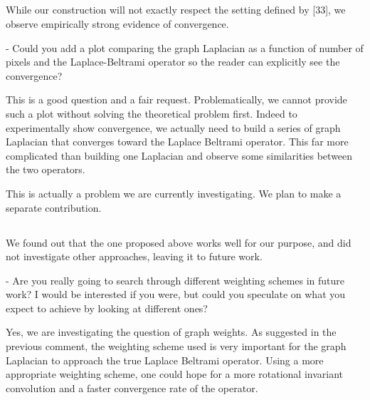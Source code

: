 \documentclass[12pt,a4paper]{article}
\newcommand{\nati}[1]{{\color[rgb]{.1,.6,.1}{NP: #1}}}
\newcommand{\1}{\b{1}}              %
\newcommand{\0}{\b{0}}              %
\begin{document}
\subsection{}
\begin{mdframed}[style=comment] 
While our construction will not exactly respect the setting defined by [33], we observe empirically strong evidence of convergence.

- Could you add a plot comparing the graph Laplacian as a function of number of pixels and the Laplace-Beltrami operator so the reader can explicitly see the convergence?
\end{mdframed}

This is a good question and a fair request. Problematically, we cannot provide such a plot without solving the theoretical problem first. Indeed to experimentally show convergence, we actually need to build a series of graph Laplacian that converges toward the Laplace Beltrami operator. This far more complicated than building one Laplacian and observe some similarities between the two operators.

This is actually a problem we are currently investigating. We plan to make a separate contribution.


\subsection{}

\begin{mdframed}[style=comment] 
We found out that the one proposed above works well for our purpose, and did not investigate other approaches, leaving it to future work.

- Are you really going to search through different weighting schemes in future work? I would be interested if you were, but could you speculate on what you expect to achieve by looking at different ones?
\end{mdframed}

Yes, we are investigating the question of graph weights.
As suggested in the previous comment, the weighting scheme used is very important for the graph Laplacian to approach the true Laplace Beltrami operator. Using a more appropriate weighting scheme, one could hope for a more rotational invariant convolution and a faster convergence rate of the operator. 
\nati{@michael, how much shall we say here?}
\end{document}

